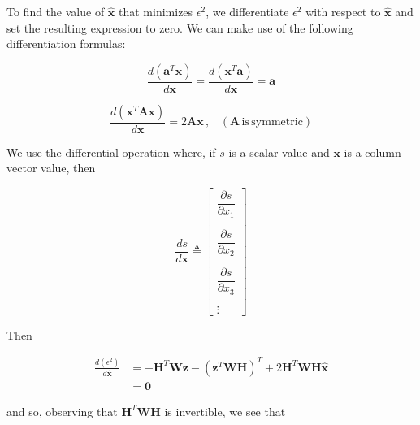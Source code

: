 To find the value of $\hat{\mathbf{x}}$ that minimizes $\epsilon^2$, we differentiate 
$\epsilon^2$ with respect to $\hat{\mathbf{x}}$ and set the resulting expression to zero.
We can make use of the following differentiation formulas:

\begin{equation*}
    \frac{ d \left( \mathbf{a}^T \mathbf{x} \right) }{d \mathbf{x}} = \frac{ d \left( \mathbf{x}^T \mathbf{a} \right) }{d \mathbf{x}} = \mathbf{a}
\end{equation*}

\begin{equation*}
    \frac{ d \left( \mathbf{x}^T \mathbf{A} \mathbf{x} \right) }{d \mathbf{x}} = 2 \mathbf{A} \mathbf{x} \, , \phantom{X} (\mathbf{A} \, \mathrm{is} \, \mathrm{symmetric})
\end{equation*}

We use the differential operation where, if $s$ is a scalar value and $\mathbf{x}$ is a
column vector value, then

\begin{equation*}
    \frac {d s} {d \mathbf{x}} \triangleq
    \begin{bmatrix}
    \dfrac{\partial s}{\partial x_{1}} \\
    \phantom{.} \\
    \dfrac{\partial s}{\partial x_{2}} \\
    \phantom{.} \\
    \dfrac{\partial s}{\partial x_{3}} \\
    \phantom{.} \\
    \vdots
    \end{bmatrix}
\end{equation*}

Then

\begin{equation*}
    \begin{aligned}
        \frac{ d \left( \epsilon^2 \right) }{d \hat{\mathbf{x}}}
        &= - \mathbf{H}^T \mathbf{W} \mathbf{z}
           - \left( \mathbf{z}^T \mathbf{W} \mathbf{H} \right)^T
           + 2 \mathbf{H}^T \mathbf{W} \mathbf{H} \hat{\mathbf{x}} \\
        &= \mathbf{0}
    \end{aligned}
\end{equation*}

and so, observing that $\mathbf{H}^T \mathbf{W} \mathbf{H}$ is invertible, we see that


